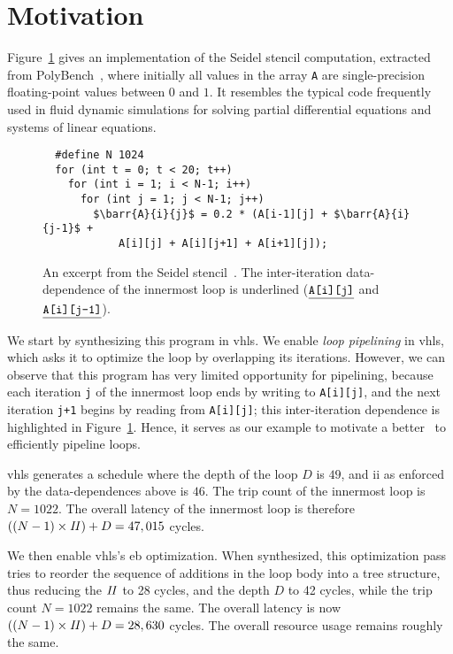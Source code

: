 \section{Motivation}
\label{lo:sec:motivation}

\newcommand\barr[3]{\texttt{\underline{#1[#2][#3]}}}

Figure~\ref{lo:fig:seidel_prog} gives an implementation of the Seidel stencil
computation, extracted from PolyBench~\cite{polybench}, where initially all
values in the array \verb|A| are single-precision floating-point values between
$0$ and $1$.  It resembles the typical code frequently used in fluid dynamic
simulations for solving partial differential equations and systems of linear
equations.

\begin{figure}[ht]
\begin{lstlisting}
  #define N 1024
  for (int t = 0; t < 20; t++)
    for (int i = 1; i < N-1; i++)
      for (int j = 1; j < N-1; j++)
        $\barr{A}{i}{j}$ = 0.2 * (A[i-1][j] + $\barr{A}{i}{j-1}$ +
            A[i][j] + A[i][j+1] + A[i+1][j]);
\end{lstlisting}
    \caption{%
        An excerpt from the Seidel stencil~\cite{polybench}.  The
        inter-iteration data-dependence of the innermost loop is underlined
        ($\barr{A}{i}{j}$ and $\barr{A}{i}{j-1}$).
    }\label{lo:fig:seidel_prog}
\end{figure}

We start by synthesizing this program in \gls{vhls}\@.  We enable \emph{loop
pipelining} in \gls{vhls}, which asks it to optimize the loop by overlapping
its iterations.  However, we can observe that this program has very limited
opportunity for pipelining, because each iteration \verb|j| of the innermost
loop ends by writing to \verb|A[i][j]|, and the next iteration \verb|j+1|
begins by reading from \verb|A[i][j]|; this inter-iteration dependence is
highlighted in Figure~\ref{lo:fig:seidel_prog}.  Hence, it serves as our
example to motivate a better \soap~to efficiently pipeline loops.

\Gls{vhls} generates a schedule where the depth of the loop $D$ is $49$, and
\gls{ii} as enforced by the data-dependences above is $46$.  The trip count of
the innermost loop is $N = 1022$.  The overall latency of the innermost loop is
therefore $((N-1) \times \mathit{II}) + D = 47,015$ cycles.

We then enable \gls{vhls}'s \gls{eb} optimization.  When synthesized, this
optimization pass tries to reorder the sequence of additions in the loop body
into a tree structure, thus reducing the $\mathit{II}$ to 28 cycles, and the depth $D$
to 42 cycles, while the trip count $N = 1022$ remains the same.  The overall
latency is now $((N-1) \times \mathit{II}) + D = 28,630$ cycles.  The overall resource
usage remains roughly the same.

